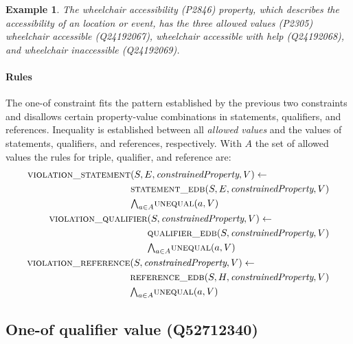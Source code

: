 \documentclass[hyperref,bachelorofscience,fleqn]{cgvpub}
\newtheorem{example}{Example}
\begin{document}
\begin{example}
The \emph{wheelchair accessibility} (P2846) property, which describes the accessibility of an location or event, has the three \emph{allowed values} (P2305) \emph{wheelchair accessible} (Q24192067), \emph{wheelchair accessible with help} (Q24192068), and \emph{wheelchair inaccessible} (Q24192069).
\end{example}

\paragraph{Rules}
The one-of constraint fits the pattern established by the previous two constraints and disallows certain property-value combinations in statements, qualifiers, and references. Inequality is established between all \emph{allowed values} and the values of statements, qualifiers, and references, respectively. With \(A\) the set of allowed values the rules for triple, qualifier, and reference are:
\begin{align}
\begin{split}
\textsc{violation\_statement}&(S, E, \emph{constrainedProperty}, V) \leftarrow \\
&\textsc{statement\_edb}(S, E, \emph{constrainedProperty}, V) \\
&{\textstyle\bigwedge}_{a \in A} \textsc{unequal}(a, V)
\end{split}\\
\begin{split}
\textsc{violation\_qualifier}&(S, \emph{constrainedProperty}, V) \leftarrow \\
&\textsc{qualifier\_edb}(S, \emph{constrainedProperty}, V) \\
&{\textstyle\bigwedge}_{a \in A} \textsc{unequal}(a, V)
\end{split}\\
\begin{split}
\textsc{violation\_reference}&(S, \emph{constrainedProperty}, V) \leftarrow \\
&\textsc{reference\_edb}(S, H, \emph{constrainedProperty}, V) \\
&{\textstyle\bigwedge}_{a \in A} \textsc{unequal}(a, V)
\end{split}
\end{align}

\subsection{One-of qualifier value (Q52712340)}
\end{document}
